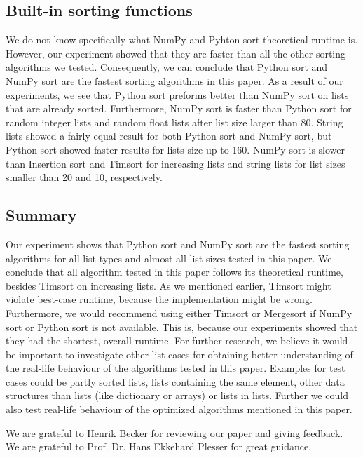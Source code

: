 \documentclass[sigconf, nonacm, natbib, screen, balance=False]{acmart}
\begin{document}
\subsection{Built-in sorting functions}

We do not know specifically what NumPy and Pyhton sort theoretical runtime is. However, our experiment showed that they are faster than all the other sorting algorithms we tested. Consequently, we can conclude that Python sort and NumPy sort are the fastest sorting algorithms in this paper. As a result of our experiments, we see that Python sort preforms better than NumPy sort on lists that are already sorted. Furthermore, NumPy sort is faster than Python sort for random integer lists and random float lists after list size larger than 80. String lists showed a fairly equal result for both Python sort and NumPy sort, but Python sort showed faster results for lists size up to 160. NumPy sort is slower than Insertion sort and Timsort for increasing lists and string lists for list sizes smaller than 20 and 10, respectively.


\subsection{Summary}
Our experiment shows that Python sort and NumPy sort are the fastest sorting algorithms for all list types and almost all list sizes tested in this paper. We conclude that all algorithm tested in this paper follows its theoretical runtime, besides Timsort on increasing lists. As we mentioned earlier, Timsort might violate best-case runtime, because the implementation might be wrong. Furthermore, we would recommend using either Timsort or Mergesort if NumPy sort or Python sort is not available. This is, because our experiments showed that they had the shortest, overall runtime. For further research, we believe it would be important to investigate other list cases for obtaining better understanding of the real-life behaviour of the algorithms tested in this paper. Examples for test cases could be partly sorted lists, lists containing the same element, other data structures than lists (like dictionary or arrays) or lists in lists. Further we could also test real-life behaviour of the optimized algorithms mentioned in this paper.
\begin{acks}
We are grateful to Henrik Becker for reviewing our paper and giving feedback. We are grateful to Prof. Dr. Hans Ekkehard Plesser for great guidance.
\end{acks}


\end{document}

